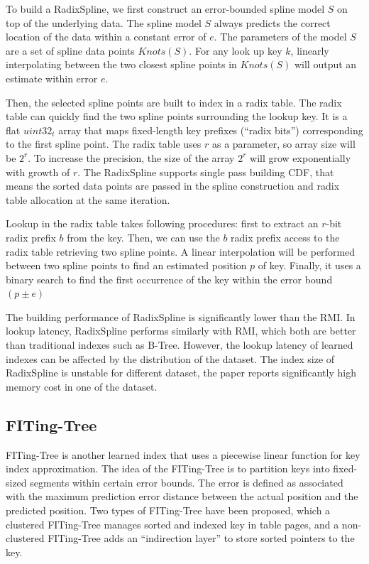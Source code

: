 To build a RadixSpline, we first construct an error-bounded spline model $S$ on top of the underlying data. The spline model $S$ always predicts the correct location of the data within a constant error of $e$. The parameters of the model $S$ are a set of spline data points $Knots(S)$. For any look up key $k$, linearly interpolating between the two closest spline points in $Knots(S)$ will output an estimate within error $e$. 

Then, the selected spline points are built to index in a radix table. The radix table can quickly find the two spline points surrounding the lookup key. It is a flat $uint32_t$ array that maps fixed-length key prefixes (“radix bits”) corresponding to the first spline point. The radix table uses $r$ as a parameter, so array size will be ${2^r}$. To increase the precision, the size of the array ${2^r}$ will grow exponentially with growth of $r$. The RadixSpline supports single pass building CDF, that means the sorted data points are passed in the spline construction and radix table allocation at the same iteration. 

Lookup in the radix table takes following procedures: first to extract an $r$-bit radix prefix $b$ from the key. Then, we can use the $b$ radix prefix access to the radix table retrieving two spline points. A linear interpolation will be performed between two spline points to find an estimated position $p$ of key. Finally, it uses a binary search to find the first occurrence of the key within the error bound $(p \pm e)$

The building performance of RadixSpline is significantly lower than the RMI. In lookup latency, RadixSpline performs similarly with RMI, which both are better than traditional indexes such as B-Tree. However, the lookup latency of learned indexes can be affected by the distribution of the dataset. The index size of RadixSpline is unstable for different dataset, the paper reports significantly high memory cost in one of the dataset. 

\subsection{FITing-Tree}
FITing-Tree \cite{galakatos2019fiting} is another learned index that uses a piecewise linear function for key index approximation. The idea of the FITing-Tree is to partition keys into fixed-sized segments within certain error bounds. The error is defined as associated with the maximum prediction error distance between the actual position and the predicted position. Two types of FITing-Tree have been proposed, which a clustered FITing-Tree manages sorted and indexed key in table pages, and a non-clustered FITing-Tree adds an “indirection layer” to store sorted pointers to the key. 

